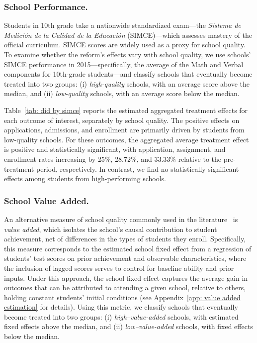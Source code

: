 \documentclass[11pt]{article}
\begin{document}
\subsubsection{School Performance.} Students in 10th grade take a nationwide standardized exam—the \emph{Sistema de Medición de la Calidad de la Educación} (SIMCE)—which assesses mastery of the official curriculum. SIMCE scores are widely used as a proxy for school quality. To examine whether the reform's effects vary with school quality, we use schools' SIMCE performance in 2015---specifically, the average of the Math and Verbal components for 10th-grade students---and classify schools that eventually become treated into two groups: (i) \textit{high-quality} schools, with an average score above the median, and (ii) \textit{low-quality} schools, with an average score below the median.

Table~\ref{tab: did by simce} reports the estimated aggregated treatment effects for each outcome of interest, separately by school quality. The positive effects on applications, admissions, and enrollment are primarily driven by students from low-quality schools. For these outcomes, the aggregated average treatment effect is positive and statistically significant, with application, assignment, and enrollment rates increasing by 25\%, 28.72\%, and 33.33\% relative to the pre-treatment period, respectively. In contrast, we find no statistically significant effects among students from high-performing schools.




\subsubsection{School Value Added.} 
An alternative measure of school quality commonly used in the literature~\citep{arteaga2022smart, camposkearns2024} is \emph{value added}, which isolates the school's causal contribution to student achievement, net of differences in the types of students they enroll. Specifically, this measure corresponds to the estimated school fixed effect from a regression of students' test scores on prior achievement and observable characteristics, where the inclusion of lagged scores serves to control for baseline ability and prior inputs. Under this approach, the school fixed effect captures the average gain in outcomes that can be attributed to attending a given school, relative to others, holding constant students' initial conditions (see Appendix~\ref{app: value added estimation} for details). Using this metric, we classify schools that eventually become treated into two groups: (i) \textit{high--value-added} schools, with estimated fixed effects above the median, and (ii) \textit{low--value-added} schools, with fixed effects below the median.
\end{document}
